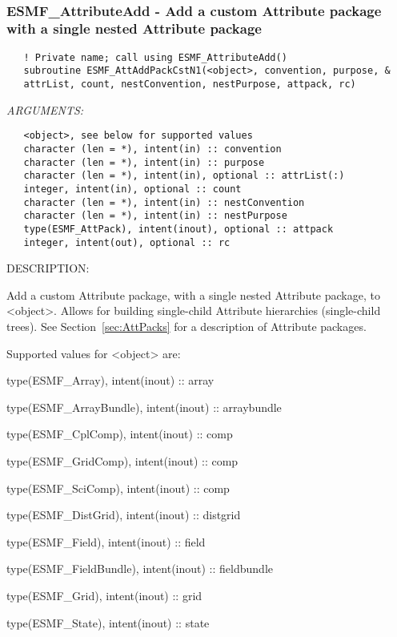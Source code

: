    
 
\mbox{}\hrulefill\ 
 
\subsubsection [ESMF\_AttributeAdd] {ESMF\_AttributeAdd - Add a custom Attribute package with a single nested Attribute package}


  
\begin{verbatim}   ! Private name; call using ESMF_AttributeAdd()
   subroutine ESMF_AttAddPackCstN1(<object>, convention, purpose, &
   attrList, count, nestConvention, nestPurpose, attpack, rc)\end{verbatim}{\em ARGUMENTS:}
\begin{verbatim}   <object>, see below for supported values
   character (len = *), intent(in) :: convention
   character (len = *), intent(in) :: purpose
   character (len = *), intent(in), optional :: attrList(:)
   integer, intent(in), optional :: count
   character (len = *), intent(in) :: nestConvention
   character (len = *), intent(in) :: nestPurpose
   type(ESMF_AttPack), intent(inout), optional :: attpack
   integer, intent(out), optional :: rc\end{verbatim}
{\sf DESCRIPTION:\\ }


   Add a custom Attribute package, with a single nested Attribute
   package, to <object>. Allows for building single-child Attribute
   hierarchies (single-child trees).
   See Section~\ref{sec:AttPacks} for a description of Attribute packages.
  
   Supported values for <object> are:
   \begin{description}
   \item type(ESMF\_Array), intent(inout) :: array
   \item type(ESMF\_ArrayBundle), intent(inout) :: arraybundle
   \item type(ESMF\_CplComp), intent(inout) :: comp
   \item type(ESMF\_GridComp), intent(inout) :: comp
   \item type(ESMF\_SciComp), intent(inout) :: comp
   \item type(ESMF\_DistGrid), intent(inout) :: distgrid
   \item type(ESMF\_Field), intent(inout) :: field
   \item type(ESMF\_FieldBundle), intent(inout) :: fieldbundle
   \item type(ESMF\_Grid), intent(inout) :: grid
   \item type(ESMF\_State), intent(inout) :: state
   \end{description}
  
